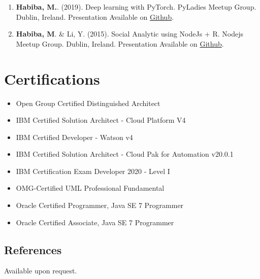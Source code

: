 \documentclass[12pt,parskip=half]{scrartcl}
\begin{document}
 \begin{enumerate}
  \leftskip-0.13in %
   \item \textbf{Habiba, M.}. (2019). Deep learning with PyTorch. PyLadies Meetup Group. Dublin, Ireland. Presentation Available on \href{https://github.com/mansura-habiba/meetup/tree/master/PyLadies_Dublin_2019}{Github}.
   \item \textbf{Habiba, M}. \& Li, Y. (2015). Social Analytic using NodeJs + R. Nodejs Meetup Group. Dublin, Ireland. Presentation Available on \href{https://github.com/mansura-habiba/meetup/blob/master/Nodejs_meetup_dublin.pptx}{Github}.
\end{enumerate}




\section*{Certifications}
\begin{itemize}
    \item Open Group Certified Distinguished Architect
    \item IBM Certified Solution Architect - Cloud Platform V4
    \item IBM Certified Developer - Watson v4
    \item IBM Certified Solution Architect - Cloud Pak for Automation v20.0.1
    \item IBM Certification Exam Developer 2020 - Level I
    \item OMG-Certified UML Professional Fundamental
    \item Oracle Certified Programmer, Java SE 7 Programmer
    \item Oracle Certified Associate, Java SE 7 Programmer
\end{itemize}    

\subsection{References}
Available upon request.
\end{document}
